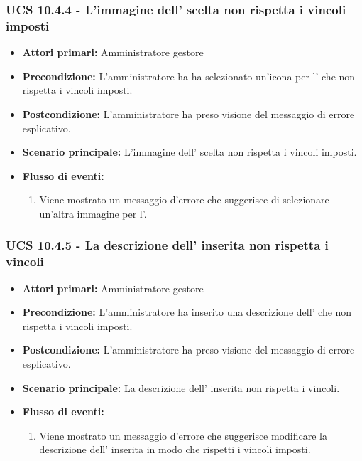 \subsubsection{UCS 10.4.4 - L'immagine dell' scelta non rispetta i vincoli imposti}%
\begin{itemize}
\item \textbf{Attori primari:} Amministratore gestore
\item \textbf{Precondizione:} L'amministratore ha ha selezionato un'icona per l' che non rispetta i vincoli imposti.
\item \textbf{Postcondizione:} L'amministratore ha preso visione del messaggio di errore esplicativo.
\item \textbf{Scenario principale:} L'immagine dell' scelta non rispetta i vincoli imposti.
\item \textbf{Flusso di eventi:}
    \begin{enumerate}
    \item Viene mostrato un messaggio d'errore che suggerisce di selezionare un'altra immagine per l'.
    \end{enumerate} 
\end{itemize}

\subsubsection{UCS 10.4.5 - La descrizione dell' inserita non rispetta i vincoli}%
\begin{itemize}
\item \textbf{Attori primari:} Amministratore gestore
\item \textbf{Precondizione:} L'amministratore ha inserito una descrizione dell' che non rispetta i vincoli imposti.
\item \textbf{Postcondizione:} L'amministratore ha preso visione del messaggio di errore esplicativo.
\item \textbf{Scenario principale:} La descrizione dell' inserita non rispetta i vincoli.
\item \textbf{Flusso di eventi:}
    \begin{enumerate}
    \item Viene mostrato un messaggio d'errore che suggerisce modificare la descrizione dell' inserita in modo che rispetti i vincoli imposti.
    \end{enumerate} 
\end{itemize}

